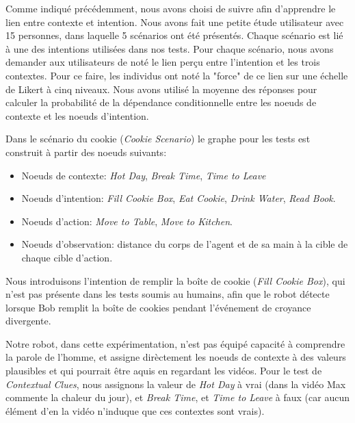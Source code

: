 \documentclass[a4paper,11pt,twoside]{StyleThese}
\begin{document}
Comme indiqué précédemment, nous avons choisi de suivre \cite{Liu2014} afin d'apprendre le lien entre contexte et intention. Nous avons fait une petite étude utilisateur avec 15 personnes, dans laquelle 5 scénarios ont été présentés. Chaque scénario est lié à une des intentions utilisées dans nos tests. Pour chaque scénario, nous avons demander aux utilisateurs de noté le lien perçu entre l'intention et les trois contextes. Pour ce faire, les individus ont noté la "force" de ce lien sur une échelle de Likert à cinq niveaux. Nous avons utilisé la moyenne des réponses pour calculer la probabilité de la dépendance conditionnelle entre les noeuds de contexte et les noeuds d'intention.


Dans le scénario  du cookie (\textit{Cookie Scenario}) le graphe pour les tests est construit à partir des noeuds suivants:
\begin{itemize}
\item Noeuds de contexte: \textit{Hot Day}, \textit{Break Time}, \textit{Time to Leave}
\item Noeuds d'intention: \textit{Fill Cookie Box}, \textit{Eat Cookie}, \textit{Drink Water}, \textit{Read Book}.
\item Noeuds d'action: \textit{Move to Table}, \textit{Move to Kitchen}.
\item Noeuds d'observation: distance du corps de l'agent et de sa main à la cible de chaque cible d'action.
\end{itemize}

Nous introduisons l'intention de remplir la boîte de cookie (\textit{Fill Cookie Box}), qui n'est pas présente dans les tests soumis au humains, afin que le robot détecte lorsque Bob remplit la boîte de cookies pendant l'événement de croyance divergente.

Notre robot, dans cette expérimentation, n'est pas équipé capacité à comprendre la parole de l'homme, et assigne dirèctement les noeuds de contexte à des valeurs plausibles et qui pourrait être aquis en regardant les vidéos. Pour le test de \textit{Contextual Clues}, nous assignons la valeur de \textit{Hot Day} à vrai (dans la vidéo Max commente la chaleur du jour), et \textit{Break Time}, et \textit{Time to Leave} à faux (car aucun élément d'en la vidéo n'induque que ces contextes sont vrais).

\end{document}
